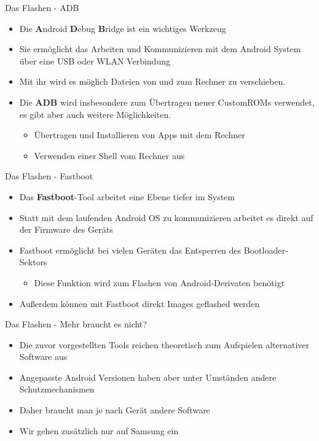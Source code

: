 \begin{frame}{Das Flashen - ADB}
	\begin{itemize}[<+->]
		\item Die \textbf{A}ndroid \textbf{D}ebug \textbf{B}ridge ist ein wichtiges Werkzeug
		\item Sie ermöglicht das Arbeiten und Kommunizieren mit dem Android System über eine USB oder WLAN Verbindung
		\item Mit ihr wird es möglich Dateien von und zum Rechner zu verschieben.
		\item Die \textbf{ADB} wird insbesondere zum Übertragen neuer CustomROMs verwendet, es gibt aber auch weitere Möglichkeiten.
		\begin{itemize}[<+->]
			\item Übertragen und Installieren von Apps mit dem Rechner
			\item Verwenden einer Shell vom Rechner aus
		\end{itemize}
	\end{itemize}
\end{frame}

\begin{frame}{Das Flashen - Fastboot}
	\begin{itemize}[<+->]
		\item Das \textbf{Fastboot}-Tool arbeitet eine Ebene tiefer im System
		\item Statt mit dem laufenden Android OS zu kommunizieren arbeitet es direkt auf der Firmware des Geräts
		\item Fastboot ermöglicht bei vielen Geräten das Entsperren des Bootloader-Sektors
		\begin{itemize}
			\item Diese Funktion wird zum Flashen von Android-Derivaten benötigt
		\end{itemize}
		\item Außerdem können mit Fastboot direkt Images geflashed werden
	\end{itemize}
\end{frame}

\begin{frame}{Das Flashen - Mehr braucht es nicht?}
	\begin{itemize}[<+->]
		\item Die zuvor vorgestellten Tools reichen theoretisch zum Aufspielen alternativer Software aus
		\item Angepasste Android Versionen haben aber unter Umständen andere Schutzmechanismen
		\item Daher braucht man je nach Gerät andere Software
		\item Wir gehen zusätzlich nur auf Samsung ein
	\end{itemize}
\end{frame}

